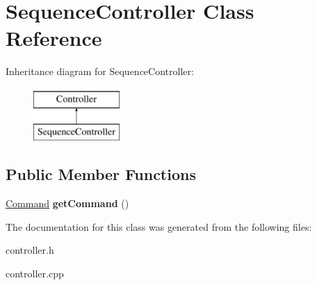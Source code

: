 \hypertarget{class_sequence_controller}{}\section{Sequence\+Controller Class Reference}
\label{class_sequence_controller}
Inheritance diagram for Sequence\+Controller\+:\begin{figure}[H]
\begin{center}
\leavevmode
\includegraphics[height=2.000000cm]{class_sequence_controller}
\end{center}
\end{figure}
\subsection*{Public Member Functions}
\begin{DoxyCompactItemize}
\item 
\mbox{\label{class_sequence_controller_a45bc2951b1783dd32abfe4e79554473f}} 
\hyperlink{struct_command}{Command} {\bfseries get\+Command} ()
\end{DoxyCompactItemize}


The documentation for this class was generated from the following files\+:\begin{DoxyCompactItemize}
\item 
controller.\+h\item 
controller.\+cpp\end{DoxyCompactItemize}
